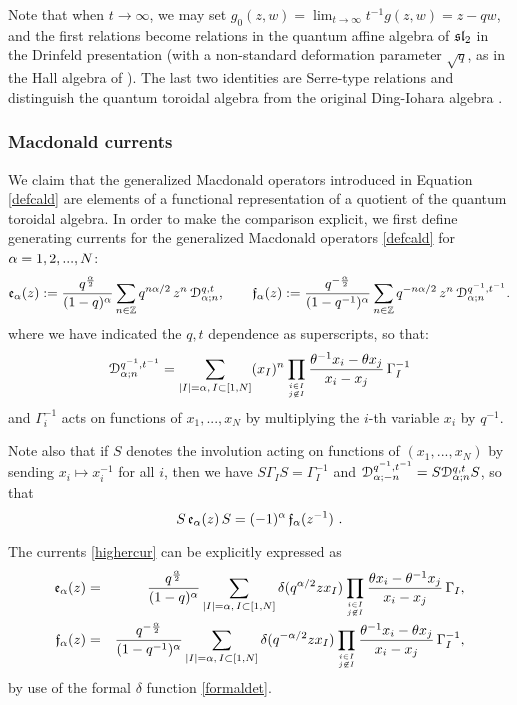 Note that when $t\to \infty$, we may set $g_0(z,w)=\lim_{t\to\infty} t^{-1}g(z,w)=z-qw$, and the first relations become relations in the quantum affine algebra of $\sl_2$ in the Drinfeld presentation (with a non-standard deformation parameter $\sqrt{q}$, as in the Hall algebra of \cite{spherical_hall}).
The last two identities are Serre-type relations and distinguish the quantum toroidal algebra from the original Ding-Iohara algebra \cite{DI}.

\subsubsection{Macdonald currents}
We claim that the generalized Macdonald operators introduced in Equation \eqref{defcald} are elements of a functional representation of a quotient of the quantum toroidal algebra. In order to make the comparison explicit, we first define generating currents for the generalized Macdonald operators \eqref{defcald}
for $\al=1,2,...,N$:
\begin{equation}\label{highercur}
{\mathfrak e}_\al(z):=\frac{q^\frac{\al}{2}}{(1-q)^\al}\sum_{n\in \Z} q^{n\al/2}\, z^n\, {\mathcal D}_{\al;n}^{q,t} , \qquad 
{\mathfrak f}_\al(z):=\frac{q^{-\frac{\al}{2}}}{(1-q^{-1})^\al}\sum_{n\in \Z} q^{-n\al/2}\, z^n\, {\mathcal D}_{\al;n}^{q^{-1},t^{-1}} .
\end{equation}
where we have indicated the $q,t$ dependence as superscripts, so that:
\begin{equation}\label{defdtilde}
{ \mathcal D}_{\al;n}^{q^{-1},t^{-1}} 
=\sum_{|I|=\al,\, I\subset [1,N]} (x_I)^n \prod_{i\in I \atop j\not \in I} 
\frac{\theta^{-1} x_i -\theta x_j}{x_i-x_j}\, \Gamma_I^{-1}
\end{equation}
and $\Gamma_i^{-1}$ acts on functions of $x_1,...,x_{N}$ by multiplying the $i$-th variable $x_i$  by $q^{-1}$.

\begin{remark}\label{remef}
Note also that if $S$ denotes the involution acting on functions of $(x_1,...,x_{N})$ by sending $x_i\mapsto x_i^{-1}$ 
for all $i$, then we have $S\Gamma_IS=\Gamma_I^{-1}$ and 
${ \mathcal D}_{\al;-n}^{q^{-1},t^{-1}} =S{ \mathcal D}_{\al;n}^{q,t}S$, so that 
$$S\, {\mathfrak e}_\al(z)\, S=(-1)^\al \, {\mathfrak f}_\al(z^{-1})\ .$$
\end{remark}

The currents \eqref{highercur} can be explicitly expressed as
\begin{eqnarray*}
{\mathfrak e}_\al(z)&=& \frac{q^\frac{\al}{2}}{(1-q)^\al}\sum_{|I|=\al,\, I\subset [1,N]} \delta(q^{\al/2}z x_I) 
\prod_{i\in I \atop j\not \in I} \frac{\theta x_i -\theta^{-1} x_j}{x_i-x_j}\, \Gamma_I, \\
{\mathfrak f}_\al(z)&=&\frac{q^{-\frac{\al}{2}}}{(1-q^{-1})^\al} \sum_{|I|=\al,\, I\subset [1,N]} \delta(q^{-\al/2}z x_I) 
\prod_{i\in I \atop j\not \in I} \frac{\theta^{-1} x_i -\theta x_j}{x_i-x_j}\, \Gamma_I^{-1},
\end{eqnarray*}
by use of the formal $\delta$ function \eqref{formaldet}.

